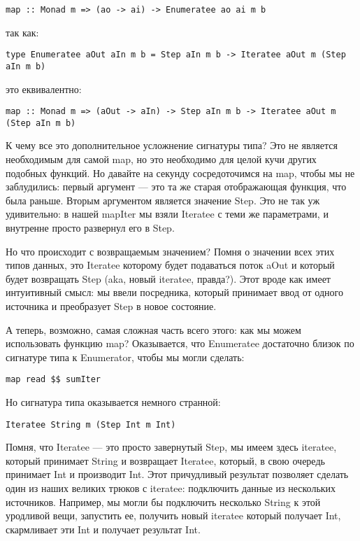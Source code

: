 \begin{lstlisting}
map :: Monad m => (ao -> ai) -> Enumeratee ao ai m b
\end{lstlisting}

так как:

\begin{lstlisting}
type Enumeratee aOut aIn m b = Step aIn m b -> Iteratee aOut m (Step aIn m b)
\end{lstlisting}

это еквивалентно:

\begin{lstlisting}
map :: Monad m => (aOut -> aIn) -> Step aIn m b -> Iteratee aOut m (Step aIn m b)
\end{lstlisting}

К чему все это дополнительное усложнение сигнатуры типа? Это не является необходимым для самой map, но это необходимо для целой кучи других подобных функций. Но давайте на секунду сосредоточимся на map, чтобы мы не заблудились: первый аргумент --- это та же старая отображающая функция, что была раньше. Вторым аргументом является значение Step. Это не так уж удивительно: в нашей mapIter мы взяли Iteratee с теми же параметрами, и внутренне просто развернул его в Step.

Но что происходит с возвращаемым значением? Помня о значении всех этих типов данных, это Iteratee которому будет подаваться поток aOut и который будет возвращать Step (aka, новый iteratee, правда?). Этот вроде как имеет интуитивный смысл: мы ввели посредника, который принимает ввод от одного источника и преобразует Step в новое состояние.

А теперь, возможно, самая сложная часть всего этого: как мы можем использовать функцию map? Оказывается, что Enumeratee достаточно близок по сигнатуре типа к Enumerator, чтобы мы могли сделать:

\begin{lstlisting}
map read $$ sumIter
\end{lstlisting}%

Но сигнатура типа оказывается немного странной:

\begin{lstlisting}
Iteratee String m (Step Int m Int)
\end{lstlisting}

Помня, что Iteratee --- это просто завернутый Step, мы имеем здесь iteratee, который принимает String и возвращает Iteratee, который, в свою очередь принимает Int и производит Int. Этот причудливый результат позволяет сделать один из наших великих трюков с iteratee: подключить данные из нескольких источников. Например, мы могли бы подключить несколько String к этой уродливой вещи, запустить ее, получить новый iteratee который получает Int, скармливает эти Int и получает результат Int.

